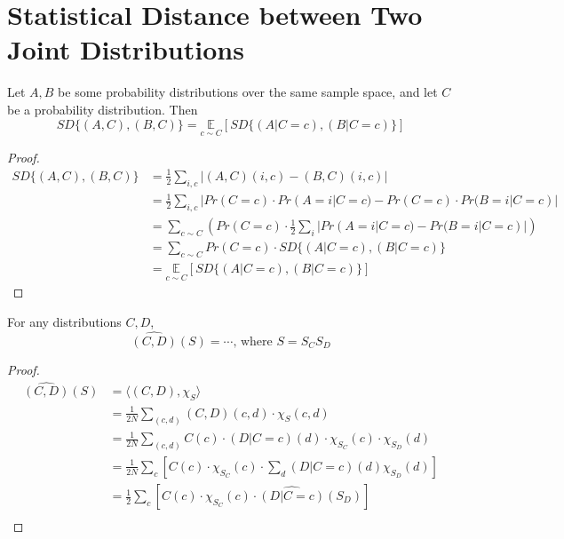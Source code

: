 \section{Statistical Distance between Two Joint Distributions}
\begin{theorem}
Let $A,B$ be some probability distributions over the same sample space, and let $C$ be a probability distribution. Then 
$$ SD \{(A,C), (B,C)\} 
= \underset{c \sim C} {\mathbb{E}} \left[ SD \{(A | C = c), (B | C=c)\} \right] $$
\end{theorem}
\begin{proof}
\begin{align*}
  SD \{(A,C), (B,C)\} 
& = \frac{1}{2} \sum\limits_{i,c} | (A,C)(i,c) - (B,C)(i,c)| \\
& = \frac{1}{2} \sum\limits_{i,c} | Pr(C = c) \cdot Pr(A = i | C =c) -
	                                Pr(C = c) \cdot Pr(B = i | C =c) |\\ 
& = \sum\limits_{c \sim C} \left( Pr(C = c) \cdot  \frac{1}{2} \sum\limits_{i} |Pr(A = i | C =c) - Pr(B = i | C =c) | \right) \\
& = \sum\limits_{c \sim C}  Pr(C = c) \cdot 
	SD \{(A | C = c), (B | C= c) \} \\ 
& = \underset{c \sim C} {\mathbb{E}} \left[ SD \{(A | C = c), (B | C=c)\} \right]		                                
\end{align*}
\end{proof}

\begin{claim}%
For any distributions $C,D$, 
$$\widehat{(C,D)}(S) = \cdots  \text{, where } S = S_CS_D $$
\end{claim}

\begin{proof}
\begin{align*}
\widehat{(C,D)}(S) 
& = \langle (C,D), \chi_S \rangle \\
& = \frac{1}{2N} \sum\limits_{(c,d)}
	(C,D)(c,d) \cdot \chi_S(c,d) \\
& = \frac{1}{2N} \sum\limits_{(c,d)}
	C(c) \cdot (D | C = c)(d) \cdot \chi_{S_C}(c) \cdot \chi_{S_D}(d) \\
& = \frac{1}{2N} \sum\limits_{c} \left
				 [C(c) \cdot \chi_{S_C}(c) \cdot 
				 \sum\limits_{d} (D | C = c)(d)	\chi_{S_D}(d) \right] \\
& = \frac{1}{2} \sum\limits_{c} \left
				 [C(c) \cdot \chi_{S_C}(c) \cdot 
				 \widehat{(D|C=c) }(S_D) \right] \\	
\end{align*}							
\end{proof}

